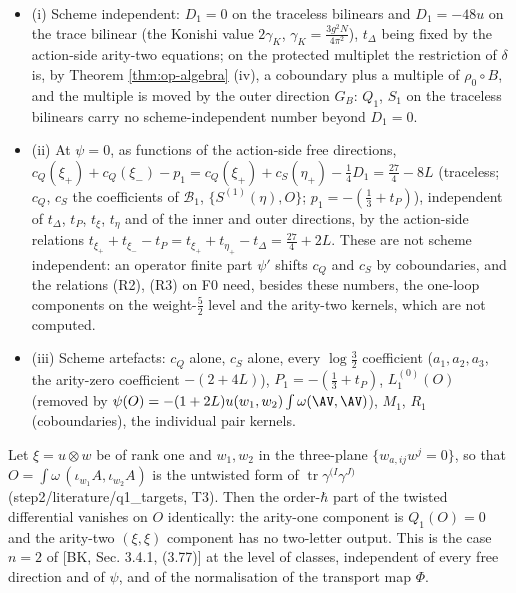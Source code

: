 \begin{corollary}
\label{cor:op-F0inv}
\begin{itemize}
\item (i) Scheme independent: $D_1=0$ on the traceless bilinears and $D_1=-48u$ on the trace bilinear (the Konishi value $2\gamma_K$, $\gamma_K=\tfrac{3g^2N}{4\pi^2}$), $t_\Delta$ being fixed by the action-side arity-two equations; on the protected multiplet the restriction of $\delta$ is, by Theorem \ref{thm:op-algebra} (iv), a coboundary plus a multiple of $\rho_0\circ B$, and the multiple is moved by the outer direction $G_B$: $Q_1$, $S_1$ on the traceless bilinears carry no scheme-independent number beyond $D_1=0$.
\item (ii) At $\psi=0$, as functions of the action-side free directions, $c_Q(\xi_+)+c_Q(\xi_-)-p_1=c_Q(\xi_+)+c_S(\eta_+)-\tfrac14D_1=\tfrac{27}4-8L$ (traceless; $c_Q$, $c_S$ the coefficients of $\mathcal B_1$, $\{S^{(1)}(\eta),O\}$; $p_1=-(\tfrac13+t_P)$), independent of $t_\Delta$, $t_P$, $t_\xi$, $t_\eta$ and of the inner and outer directions, by the action-side relations $t_{\xi_+}+t_{\xi_-}-t_P=t_{\xi_+}+t_{\eta_+}-t_\Delta=\tfrac{27}4+2L$. These are not scheme independent: an operator finite part $\psi'$ shifts $c_Q$ and $c_S$ by coboundaries, and the relations (R2), (R3) on F0 need, besides these numbers, the one-loop components on the weight-$\tfrac52$ level and the arity-two kernels, which are not computed.
\item (iii) Scheme artefacts: $c_Q$ alone, $c_S$ alone, every $\log\tfrac32$ coefficient ($a_1,a_2,a_3$, the arity-zero coefficient $-(2+4L)$), $P_1=-(\tfrac13+t_P)$, $L_1^{(0)}(O)$ (removed by $\psi(O)=-(1+2L)u(w_1,w_2)\int\omega(\AV,\AV)$), $M_1$, $R_1$ (coboundaries), the individual pair kernels.
\end{itemize}
\end{corollary}

\begin{proposition}
\label{prop:op-twistF0}
Let $\xi=u\otimes w$ be of rank one and $w_1,w_2$ in the three-plane $\{w_{a,ij}w^j=0\}$, so that $O=\int\omega\,(\iota_{w_1}A,\iota_{w_2}A)$ is the untwisted form of $\operatorname{tr}\gamma^{(I}\gamma^{J)}$ (step2/literature/q1\_targets, T3). Then the order-$\hbar$ part of the twisted differential vanishes on $O$ identically: the arity-one component is $Q_1(O)=0$ and the arity-two $(\xi,\xi)$ component has no two-letter output. This is the case $n=2$ of [BK, Sec. 3.4.1, (3.77)] at the level of classes, independent of every free direction and of $\psi$, and of the normalisation of the transport map $\Phi$.
\end{proposition}

